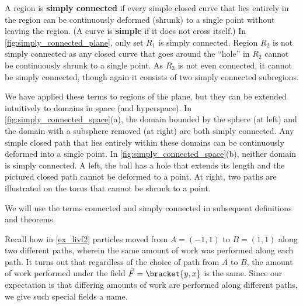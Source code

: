 A region is \textbf{simply connected} if every simple closed curve that lies entirely in the region can be continuously deformed (shrunk) to a single point without leaving the region.  (A curve is \textbf{simple} if it does not cross itself.) In \autoref{fig:simply_connected_plane}, only set $R_1$ is simply connected. Region $R_2$ is not simply connected as any closed curve that goes around the ``hole'' in $R_2$ cannot be continuously shrunk to a single point. As $R_3$ is not even connected, it cannot be simply connected, though again it consists of two simply connected subregions. 


We have applied these terms to regions of the plane, but they can be extended intuitively to domains in space (and hyperspace). In \autoref{fig:simply_connected_space}(a), the domain bounded by the sphere (at left) and the domain with a subsphere removed (at right) are both simply connected. Any simple closed path that lies entirely within these domains can be continuously deformed into a single point. In \autoref{fig:simply_connected_space}(b), neither domain is simply connected. A left, the ball has a hole that extends its length and the pictured closed path cannot be deformed to a point. At right, two paths are illustrated on the torus that cannot be shrunk to a point. 

We will use the terms connected and simply connected in subsequent definitions and theorems.

Recall how in \autoref{ex_livf2} particles moved from $A = (-1,1)$ to $B = (1,1)$ along two different paths, wherein the same amount of work was performed along each path. It turns out that regardless of the choice of path from $A$ to $B$, the amount of work performed under the field $\vec F =\bracket{y, x}$ is the same. Since our expectation is that differing amounts of work are performed along different paths, we give such special fields a name. %

